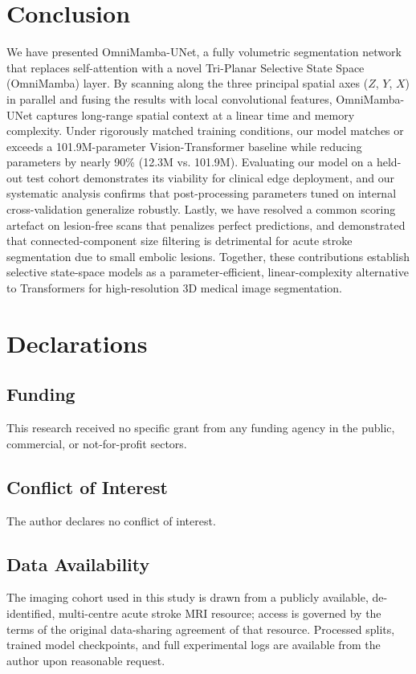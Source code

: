 \documentclass[pdflatex,sn-mathphys-num]{sn-jnl}
\begin{document}
\section{Conclusion}\label{sec:conclusion}

We have presented OmniMamba-UNet, a fully volumetric segmentation network that replaces self-attention with a novel Tri-Planar Selective State Space (OmniMamba) layer. By scanning along the three principal spatial axes ($Z$, $Y$, $X$) in parallel and fusing the results with local convolutional features, OmniMamba-UNet captures long-range spatial context at a linear time and memory complexity. Under rigorously matched training conditions, our model matches or exceeds a 101.9M-parameter Vision-Transformer baseline while reducing parameters by nearly 90\% (12.3M vs. 101.9M). Evaluating our model on a held-out test cohort demonstrates its viability for clinical edge deployment, and our systematic analysis confirms that post-processing parameters tuned on internal cross-validation generalize robustly. Lastly, we have resolved a common scoring artefact on lesion-free scans that penalizes perfect predictions, and demonstrated that connected-component size filtering is detrimental for acute stroke segmentation due to small embolic lesions. Together, these contributions establish selective state-space models as a parameter-efficient, linear-complexity alternative to Transformers for high-resolution 3D medical image segmentation.

\backmatter

\section*{Declarations}

\subsection*{Funding}
This research received no specific grant from any funding agency in
the public, commercial, or not-for-profit sectors.

\subsection*{Conflict of Interest}
The author declares no conflict of interest.

\subsection*{Data Availability}
The imaging cohort used in this study is drawn from a publicly
available, de-identified, multi-centre acute stroke MRI resource;
access is governed by the terms of the original data-sharing
agreement of that resource. Processed splits, trained model
checkpoints, and full experimental logs are available from the author
upon reasonable request.
\end{document}
